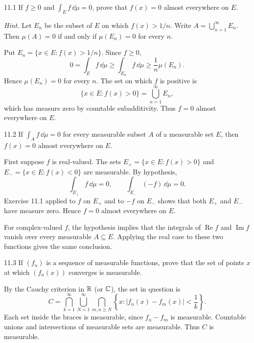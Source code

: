\documentclass[11pt,oneside]{article}
\begin{document}
\begin{exercise}{11.1}
If $f\ge0$ and $\int_E f\,\dd\mu=0$, prove that $f(x)=0$ almost everywhere on $E$.

\textit{Hint.} Let $E_n$ be the subset of $E$ on which $f(x)>1/n$. Write $A=\bigcup_{n=1}^\infty E_n$. Then $\mu(A)=0$ if and only if $\mu(E_n)=0$ for every $n$.
\end{exercise}
\begin{solution}
Put $E_n=\{x\in E:f(x)>1/n\}$. Since $f\ge0$,
\[
 0=\int_E f\,\dd\mu\ge\int_{E_n}f\,\dd\mu
 \ge\frac1n\mu(E_n).
\]
Hence $\mu(E_n)=0$ for every $n$. The set on which $f$ is positive is
\[
 \{x\in E:f(x)>0\}=\bigcup_{n=1}^\infty E_n,
\]
which has measure zero by countable subadditivity. Thus $f=0$ almost everywhere on $E$.
\end{solution}

\begin{exercise}{11.2}
If $\int_A f\,\dd\mu=0$ for every measurable subset $A$ of a measurable set $E$, then $f(x)=0$ almost everywhere on $E$.
\end{exercise}
\begin{solution}
First suppose $f$ is real-valued. The sets
$E_+=\{x\in E:f(x)>0\}$ and $E_-=\{x\in E:f(x)<0\}$ are measurable. By hypothesis,
\[
 \int_{E_+}f\,\dd\mu=0,
 \qquad\int_{E_-}(-f)\,\dd\mu=0.
\]
Exercise 11.1 applied to $f$ on $E_+$ and to $-f$ on $E_-$ shows that both $E_+$ and $E_-$ have measure zero. Hence $f=0$ almost everywhere on $E$.

For complex-valued $f$, the hypothesis implies that the integrals of $\operatorname{Re}f$ and $\operatorname{Im}f$ vanish over every measurable $A\subseteq E$. Applying the real case to these two functions gives the same conclusion.
\end{solution}

\begin{exercise}{11.3}
If $(f_n)$ is a sequence of measurable functions, prove that the set of points $x$ at which $(f_n(x))$ converges is measurable.
\end{exercise}
\begin{solution}
By the Cauchy criterion in $\mathbb{R}$ (or $\mathbb{C}$), the set in question is
\[
 C=\bigcap_{k=1}^\infty\bigcup_{N=1}^\infty
       \bigcap_{m,n\ge N}
       \left\{x:|f_n(x)-f_m(x)|<\frac1k\right\}.
\]
Each set inside the braces is measurable, since $f_n-f_m$ is measurable. Countable unions and intersections of measurable sets are measurable. Thus $C$ is measurable.
\end{solution}
\end{document}

